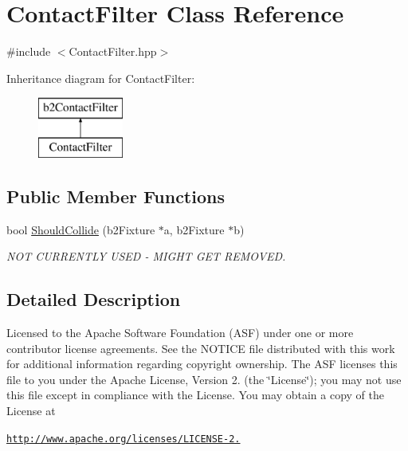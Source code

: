 \hypertarget{class_contact_filter}{\section{Contact\+Filter Class Reference}
\label{class_contact_filter}
}


{\ttfamily \#include $<$Contact\+Filter.\+hpp$>$}

Inheritance diagram for Contact\+Filter\+:\begin{figure}[H]
\begin{center}
\leavevmode
\includegraphics[height=2.000000cm]{class_contact_filter}
\end{center}
\end{figure}
\subsection*{Public Member Functions}
\begin{DoxyCompactItemize}
\item 
bool \hyperlink{class_contact_filter_aa1f43a83fda36c0d4e0479e370350585}{Should\+Collide} (b2\+Fixture $\ast$a, b2\+Fixture $\ast$b)
\begin{DoxyCompactList}\small\item\em N\+O\+T C\+U\+R\+R\+E\+N\+T\+L\+Y U\+S\+E\+D -\/ M\+I\+G\+H\+T G\+E\+T R\+E\+M\+O\+V\+E\+D. \end{DoxyCompactList}\end{DoxyCompactItemize}


\subsection{Detailed Description}
Licensed to the Apache Software Foundation (A\+S\+F) under one or more contributor license agreements. See the N\+O\+T\+I\+C\+E file distributed with this work for additional information regarding copyright ownership. The A\+S\+F licenses this file to you under the Apache License, Version 2. (the \char`\"{}\+License\char`\"{}); you may not use this file except in compliance with the License. You may obtain a copy of the License at

\href{http://www.apache.org/licenses/LICENSE-2.0}{\tt http\+://www.\+apache.\+org/licenses/\+L\+I\+C\+E\+N\+S\+E-\/2.}

